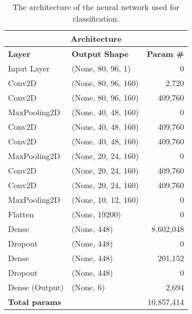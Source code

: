 \documentclass{article}
\begin{document}
\begin{table}[ht]
    \caption{The architecture of the neural network used for classification.}
    \vspace{0.2cm}
    \label{tab:dnn_architecture}
    \centering
    \begin{adjustbox}{max width=\textwidth}
    \begin{tabular}{l|l|r}
        \toprule
        \multicolumn{3}{c}{\textbf{Architecture}} \\
        \midrule
        \textbf{Layer} & \textbf{Output Shape} & \textbf{Param \#} \\
        \midrule
        Input Layer & (None, 80, 96, 1) & 0 \\
        Conv2D & (None, 80, 96, 160) & 2,720 \\
        Conv2D & (None, 80, 96, 160) & 409,760 \\
        MaxPooling2D & (None, 40, 48, 160) & 0 \\
        Conv2D & (None, 40, 48, 160) & 409,760 \\
        Conv2D & (None, 40, 48, 160) & 409,760 \\
        MaxPooling2D & (None, 20, 24, 160) & 0 \\
        Conv2D & (None, 20, 24, 160) & 409,760 \\
        Conv2D & (None, 20, 24, 160) & 409,760 \\
        MaxPooling2D & (None, 10, 12, 160) & 0 \\
        Flatten & (None, 19200) & 0 \\
        Dense & (None, 448) & 8,602,048 \\
        Dropout & (None, 448) & 0 \\
        Dense & (None, 448) & 201,152 \\
        Dropout & (None, 448) & 0 \\
        Dense (Output) & (None, 6) & 2,694 \\
        \midrule
        \multicolumn{2}{l|}{\textbf{Total params}} & 10,857,414 \\
        \bottomrule
    \end{tabular}
    \end{adjustbox}
\end{table}
\end{document}
